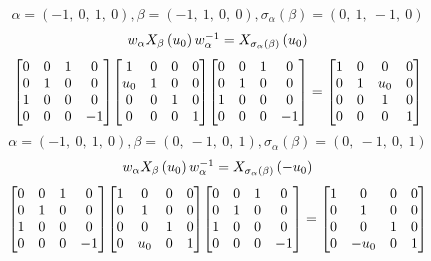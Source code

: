\documentclass[11pt]{article}
\theoremstyle{definition}
\begin{document}
\[
\alpha = \left( -1, \  0, \  1, \  0\right), \beta = \left( -1, \  1, \  0, \  0\right), \sigma_{\alpha}(\beta) = \left( 0, \  1, \  -1, \  0\right)
\]
\[
\scaletoalign{\textwidth}{w_{\alpha} X_{\beta}\left(u_{0}\right) w_{\alpha}^{-1} = X_{\sigma_{\alpha}\left(\beta\right)}\left(u_{0}\right)}
\]
\[
\scaletoalign{\textwidth}{{\left[\begin{matrix}0 & 0 & 1 & 0\\0 & 1 & 0 & 0\\1 & 0 & 0 & 0\\0 & 0 & 0 & -1\end{matrix}\right]} {\left[\begin{matrix}1 & 0 & 0 & 0\\u_{0} & 1 & 0 & 0\\0 & 0 & 1 & 0\\0 & 0 & 0 & 1\end{matrix}\right]} {\left[\begin{matrix}0 & 0 & 1 & 0\\0 & 1 & 0 & 0\\1 & 0 & 0 & 0\\0 & 0 & 0 & -1\end{matrix}\right]} = {\left[\begin{matrix}1 & 0 & 0 & 0\\0 & 1 & u_{0} & 0\\0 & 0 & 1 & 0\\0 & 0 & 0 & 1\end{matrix}\right]}}
\]
\[
\alpha = \left( -1, \  0, \  1, \  0\right), \beta = \left( 0, \  -1, \  0, \  1\right), \sigma_{\alpha}(\beta) = \left( 0, \  -1, \  0, \  1\right)
\]
\[
\scaletoalign{\textwidth}{w_{\alpha} X_{\beta}\left(u_{0}\right) w_{\alpha}^{-1} = X_{\sigma_{\alpha}\left(\beta\right)}\left(- u_{0}\right)}
\]
\[
\scaletoalign{\textwidth}{{\left[\begin{matrix}0 & 0 & 1 & 0\\0 & 1 & 0 & 0\\1 & 0 & 0 & 0\\0 & 0 & 0 & -1\end{matrix}\right]} {\left[\begin{matrix}1 & 0 & 0 & 0\\0 & 1 & 0 & 0\\0 & 0 & 1 & 0\\0 & u_{0} & 0 & 1\end{matrix}\right]} {\left[\begin{matrix}0 & 0 & 1 & 0\\0 & 1 & 0 & 0\\1 & 0 & 0 & 0\\0 & 0 & 0 & -1\end{matrix}\right]} = {\left[\begin{matrix}1 & 0 & 0 & 0\\0 & 1 & 0 & 0\\0 & 0 & 1 & 0\\0 & - u_{0} & 0 & 1\end{matrix}\right]}}
\]
\end{document}
